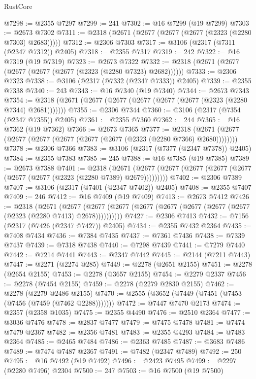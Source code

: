 \begin{lexlean}{RustCore}
\begin{coremodule}
@7298 := @2355 @7297
@7299 := 241
@7302 := @16 @7299 (@19 @7299)
@7303 := @2673 @7302
@7311 := @2318 (@2671 (@2677 (@2677 (@2677 (@2323 (@2280 @7303) @2683)))))
@7312 := @2306 @7303
@7317 := @3106 (@2317 (@7311 (@2347 @7312)) @2405)
@7318 := @2355 @7317
@7319 := 242
@7322 := @16 @7319 (@19 @7319)
@7323 := @2673 @7322
@7332 := @2318 (@2671 (@2677 (@2677 (@2677 (@2677 (@2323 (@2280 @7323) @2682))))))
@7333 := @2306 @7323
@7338 := @3106 (@2317 (@7332 (@2347 @7333)) @2405)
@7339 := @2355 @7338
@7340 := 243
@7343 := @16 @7340 (@19 @7340)
@7344 := @2673 @7343
@7354 := @2318 (@2671 (@2677 (@2677 (@2677 (@2677 (@2677 (@2323 (@2280 @7344) @2681)))))))
@7355 := @2306 @7344
@7360 := @3106 (@2317 (@7354 (@2347 @7355)) @2405)
@7361 := @2355 @7360
@7362 := 244
@7365 := @16 @7362 (@19 @7362)
@7366 := @2673 @7365
@7377 := @2318 (@2671 (@2677 (@2677 (@2677 (@2677 (@2677 (@2677 (@2323 (@2280 @7366) @2680))))))))
@7378 := @2306 @7366
@7383 := @3106 (@2317 (@7377 (@2347 @7378)) @2405)
@7384 := @2355 @7383
@7385 := 245
@7388 := @16 @7385 (@19 @7385)
@7389 := @2673 @7388
@7401 := @2318
    (@2671 (@2677 (@2677 (@2677 (@2677 (@2677 (@2677 (@2677 (@2323 (@2280 @7389) @2679)))))))))
@7402 := @2306 @7389
@7407 := @3106 (@2317 (@7401 (@2347 @7402)) @2405)
@7408 := @2355 @7407
@7409 := 246
@7412 := @16 @7409 (@19 @7409)
@7413 := @2673 @7412
@7426 := @2318
    (@2671
      (@2677 (@2677 (@2677 (@2677 (@2677 (@2677 (@2677 (@2677 (@2323 (@2280 @7413) @2678))))))))))
@7427 := @2306 @7413
@7432 := @7156 (@2317 (@7426 (@2347 @7427)) @2405)
@7434 := @2355 @7432 @2364
@7435 := @7408 @7434
@7436 := @7384 @7435
@7437 := @7361 @7436
@7438 := @7339 @7437
@7439 := @7318 @7438
@7440 := @7298 @7439
@7441 := @7279 @7440
@7442 := @7214 @7441
@7443 := @2347 @7442
@7445 := @2144 (@7211 @7443)
@7447 := @2271 (@2274 @285)
@7449 := @2278 (@2651 @2155)
@7451 := @2278 (@2654 @2155)
@7453 := @2278 (@3657 @2155)
@7454 := @2279 @2337
@7456 := @2278 (@7454 @2155)
@7459 := @2278 (@2279 @2830 @2155)
@7462 := @2278 (@2279 @2486 @2155)
@7470 := @2555 (@3652 (@7449 (@7451 (@7453 (@7456 (@7459 (@7462 @2288)))))))
@7472 := @7447 @7470 @2173
@7474 := @2357 (@2358 @1035)
@7475 := @2355 @4490
@7476 := @2510 @2364
@7477 := @3036 @7476
@7478 := @2837 @7477
@7479 := @7475 @7478
@7481 := @7474 @7479 @2367
@7482 := @2356 @7481
@7483 := @2355 @4293
@7484 := @7483 @2364
@7485 := @2465 @7484
@7486 := @2363 @7485
@7487 := @3683 @7486
@7489 := @7474 @7487 @2367
@7491 := @7482 (@2347 @7489)
@7492 := 250
@7495 := @16 @7492 (@19 @7492)
@7496 := @2423 @7495
@7499 := @2297 (@2280 @7496) @2304
@7500 := 247
@7503 := @16 @7500 (@19 @7500)

\end{coremodule}
\end{lexlean}
